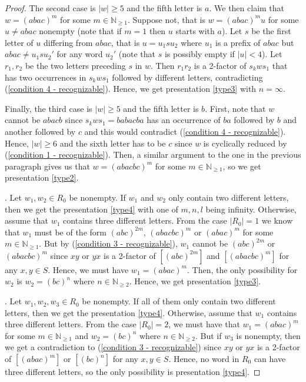 \documentclass[10pt,a4paper]{amsart}
\newcommand{\N}{\mathbb{N}}
\begin{document}
\begin{proof}
    The second case is $|w|\geq 5$ and the fifth letter is $a$. We then claim that $w = (abac)^m$ for some $m\in \N_{\geq 1}$. Suppose not, that is $w = (abac)^mu$ for some $u \neq abac$ nonempty (note that if $m=1$ then $u$ starts with $a$). Let $s$ be the first letter of $u$ differing from $abac$, that is $u=u_1su_2$ where $u_1$ is a prefix of $abac$ but $abac \neq u_1su_2'$ for any word $u_2'$ (note that $s$ is possibly empty if $|u|<4$). Let $r_1,r_2$ be the two letters preceding $s$ in $w$. Then $r_1r_2$ is a 2-factor of $s_kws_1$ that has two occurrences in $s_kws_1$ followed by different letters, contradicting (\ref{condition 4 - recognizable}). Hence, we get presentation \ref{type3} with $n=\infty$. 
    
    Finally, the third case is $|w|\geq 5$ and the fifth letter is $b$. First, note that $w$ cannot be $abacb$ since $s_kws_1 = babacba$ has an occurrence of $ba$ followed by $b$ and another followed by $c$ and this would contradict (\ref{condition 4 - recognizable}). Hence, $|w|\geq 6$ and the sixth letter has to be $c$ since $w$ is cyclically reduced by (\ref{condition 1 - recognizable}). Then, a similar argument to the one in the previous paragraph gives us that $w = (abacbc)^m$ for some $m\in \N_{\geq 1}$, so we get presentation \ref{type2}.


    \smallskip
    . Let $w_1,w_2 \in R_0$ be nonempty. If $w_1$ and $w_2$ only contain two different letters, then we get the presentation \ref{type4} with one of $m,n,l$ being infinity. Otherwise, assume that $w_1$ contains three different letters. From the case $|R_0|= 1$ we know that $w_1$ must be of the form $(abc)^{2m}$, $(abacbc)^m$ or $(abac)^m$ for some $m \in  \N_{\geq 1}$. But by (\ref{condition 3 - recognizable}), $w_1$ cannot be $(abc)^{2m}$ or  $(abacbc)^m$ since $xy$ or $yx$ is a 2-factor of $[(abc)^{2m}]$ and $[(abacbc)^m]$ for any $x,y \in S$. Hence, we must have $w_1 = (abac)^m$. Then, the only possibility for $w_2$ is $w_2 = (bc)^n$ where $n \in  \N_{\geq 2}$. Hence, we get presentation \ref{type3}.

    \smallskip
    . Let $w_1,w_2,w_3 \in R_0$ be nonempty. If all of them only contain two different letters, then we get the presentation \ref{type4}. Otherwise, assume that $w_1$ contains three different letters. From the case $|R_0| = 2$, we must have that $w_1 = (abac)^m$ for some $m \in  \N_{\geq 1}$ and $w_2 = (bc)^n$ where $n \in  \N_{\geq 2}$. But if $w_3$ is nonempty, then we get a contradiction to (\ref{condition 3 - recognizable}) since $xy$ or $yx$ is a 2-factor of $[(abac)^m]$ or $[(bc)^n]$ for any $x,y \in S$. Hence, no word in $R_0$ can have three different letters, so the only possibility is presentation \ref{type4}.
  \end{proof}
\end{document}

